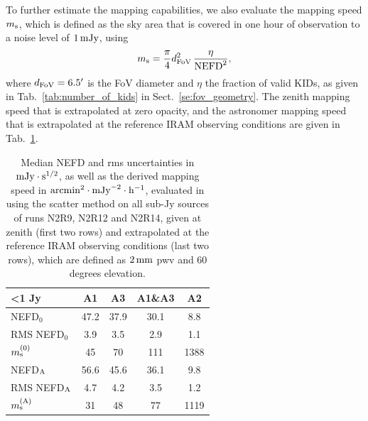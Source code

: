 To further estimate the mapping capabilities, we also evaluate the
mapping speed $m_{\rm{s}}$, which is defined as the sky area that is covered in one
hour of observation to a noise level of $1\,\rm{mJy}$, using
\begin{equation}
m_{\rm{s}} = \frac{\pi}{4} d_{\rm{FoV}}^2 \, \frac{\eta}{\rm{NEFD}^2},
\end{equation}
where $d_{\rm{FoV}} = 6.5'$ is the FoV diameter and $\eta$ the
fraction of valid KIDs, as given in Tab.~\ref{tab:number_of_kids} in
Sect.~\ref{se:fov_geometry}.
The zenith mapping speed that is extrapolated at zero opacity, and the astronomer
mapping speed that is extrapolated at the reference IRAM observing conditions are
given in Tab.~\ref{tab:nefd_astro}.   

\begin{table}
\begin{center}
\begin{tabular}{|l|c|c|c|c|}
  \hline
 <1 Jy               & A1      &   A3    &   A1\&A3 &    A2    \\  
\hline\hline
NEFD$_0$             & 47.2    & 37.9    &    30.1  &    8.8   \\
RMS NEFD$_0$         &  3.9    &  3.5    &     2.9  &    1.1   \\
$m_{\rm{s}}^{(0)}$     & 45      &  70     &    111   &   1388   \\
\hline
NEFD$_{\rm{A}}$        & 56.6    & 45.6    &    36.1  &    9.8   \\
RMS NEFD$_{\rm{A}}$    &  4.7    & 4.2     &      3.5 &    1.2   \\
$m_{\rm{s}}^{(\rm{A})}$  &  31    & 48      &    77     &   1119   \\
\hline
\hline
\end{tabular}
\caption[NEFD estimates on all sub-Jy sources]{Median NEFD and rms
uncertainties in $\rm{mJy}\cdot \rm{s}^{1/2}$, as well as the derived mapping
speed in $\rm{arcmin}^2\cdot\rm{mJy}^{-2}\cdot\rm{h}^{-1}$, evaluated
in using the scatter method on all sub-Jy sources of runs N2R9, N2R12
and N2R14, given at zenith (first two rows) and extrapolated at the
reference IRAM observing conditions (last two rows), which are defined
as $2\,\rm{mm}$ pwv and 60 degrees elevation.}
\label{tab:nefd_astro}
\end{center}
\end{table}


